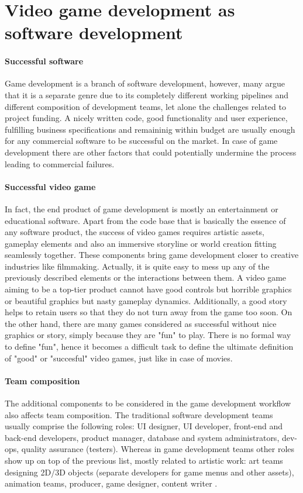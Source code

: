 \section{Video game development as software development} \label{game-development-sw}
\paragraph{Successful software}
Game development is a branch of software development, however, many argue that it is a separate genre
due to its completely different working pipelines and different composition of development teams, let alone the challenges 
related to project funding. A nicely written code, good functionality and user experience, fulfilling business specifications 
and remaininig within budget are usually enough for any commercial software to be successful on the market. In case of game 
development there are other factors that could potentially undermine the process leading to commercial failures.
\paragraph{Successful video game}
In fact, the end product of game development is mostly an entertainment or educational software. Apart from the code 
base that is basically the essence of any software product, the success of video games requires artistic assets, 
gameplay elements and also an immersive storyline or world creation fitting seamlessly together.
These components bring game development closer to creative industries like filmmaking. Actually, it is quite easy to mess
up any of the previously described elements or the interactions between them. 
A video game aiming to be a top-tier product cannot have good controls but horrible graphics
or beautiful graphics but nasty gameplay dynamics. Additionally, a good story helps to retain users so that
they do not turn away from the game too soon. On the other hand, there are many games considered as successful without
nice graphics or story, simply because they are "fun" to play. There is no formal way to define "fun", hence it becomes
a difficult task to define the ultimate definition of "good" or "succesful" video games, just like in case of movies.

\paragraph{Team composition}
The additional components to be considered in the game development workflow also affects team composition. The traditional
software development teams usually comprise the following roles: UI designer, UI developer, front-end and back-end developers,
product manager, database and system administrators, dev-ops, quality assurance (testers). Whereas in game development teams
other roles show up on top of the previous list, mostly related to artistic work: art teams designing 2D/3D objects 
(separate developers for game menus and other assets), animation teams, producer, game designer, content writer 
\cite{team-composition}.

